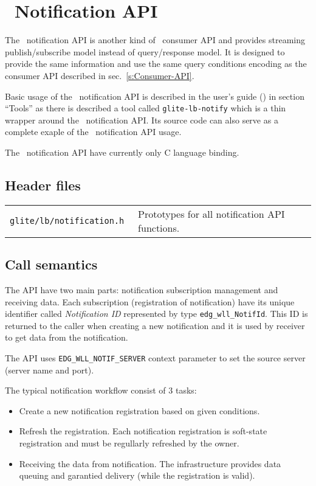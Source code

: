 
\section{\LB\ Notification API}
\label{s:Notification-API}


The \LB\ notification API is another kind of \LB\ consumer API and
provides streaming publish/subscribe model instead of query/response
model. It is designed to provide the same information and use the same
query conditions encoding as the consumer API described in sec.~\ref{s:Consumer-API}.

Basic usage of the \LB\ notification API is described in the \LB
user's guide (\cite{lbug}) in section ``Tools'' as there is described
a tool called \verb'glite-lb-notify' which is a thin wrapper around
the \LB\ notification API. Its source code can also serve as a
complete exaple of the \LB\ notification API usage.

The \LB\ notification API have currently only C language binding.

\subsection{Header files}
\begin{table}[h]
\begin{tabularx}{\textwidth}{>{\tt}lX}
glite/lb/notification.h & Prototypes for all notification API functions. \\
\end{tabularx}
\end{table}

\subsection{Call semantics}
The API have two main parts: notification subscription management and
receiving data. Each subscription (registration of notification) have
its unique identifier called \emph{Notification ID} represented by
type \verb'edg_wll_NotifId'. This ID is returned to the caller when
creating a new notification and it is used by receiver to get data
from the notification.

The API uses \verb'EDG_WLL_NOTIF_SERVER' context parameter to set the
source server (\LB server name and port). 

The typical notification workflow consist of 3 tasks:
\begin{itemize}
 \item Create a new notification registration based on given conditions.
 \item Refresh the registration. Each notification registration is
  soft-state registration and must be regullarly refreshed by the
  owner.
 \item Receiving the data from notification. The \LB infrastructure
  provides data queuing and garantied delivery (while the registration
  is valid).
\end{itemize}

